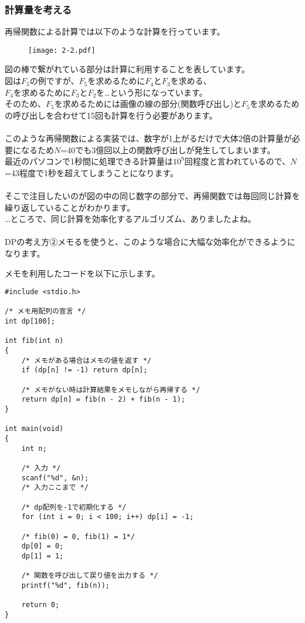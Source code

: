 \clearpage

\subsubsection{計算量を考える}
再帰関数による計算では以下のような計算を行っています。

\begin{figure}[H]
    \centering
    \texttt{[image: 2-2.pdf]}
\end{figure}

図の棒で繋がれている部分は計算に利用することを表しています。\\
図は$F_5$の例ですが、$F_5$を求めるために$F_4$と$F_3$を求める、\\
$F_4$を求めるために$F_3$と$F_2$を…という形になっています。\\
そのため、$F_5$を求めるためには画像の線の部分(関数呼び出し)と$F_5$を求めるための呼び出しを合わせて15回も計算を行う必要があります。
\\ \\ \noindent
このような再帰関数による実装では、数字が1上がるだけで大体2倍の計算量が必要になるため$N$=40でも3億回以上の関数呼び出しが発生してしまいます。\\
最近のパソコンで1秒間に処理できる計算量は$10^9$回程度と言われているので、$N$=43程度で1秒を超えてしまうことになります。
\\ \\ \noindent
そこで注目したいのが図の中の同じ数字の部分で、再帰関数では毎回同じ計算を繰り返していることがわかります。\\
…ところで、同じ計算を効率化するアルゴリズム、ありましたよね。
\\ \\ \noindent
DPの考え方②メモるを使うと、このような場合に大幅な効率化ができるようになります。

\clearpage
\noindent
メモを利用したコードを以下に示します。

\begin{lstlisting}[style = customC]
#include <stdio.h>

/* メモ用配列の宣言 */
int dp[100];

int fib(int n)
{
    /* メモがある場合はメモの値を返す */
    if (dp[n] != -1) return dp[n];

    /* メモがない時は計算結果をメモしながら再帰する */
    return dp[n] = fib(n - 2) + fib(n - 1);
}

int main(void) 
{
    int n;

    /* 入力 */
    scanf("%d", &n);
    /* 入力ここまで */

    /* dp配列を-1で初期化する */
    for (int i = 0; i < 100; i++) dp[i] = -1;

    /* fib(0) = 0, fib(1) = 1*/
    dp[0] = 0;
    dp[1] = 1;

    /* 関数を呼び出して戻り値を出力する */
    printf("%d", fib(n));

    return 0; 
}
\end{lstlisting}

